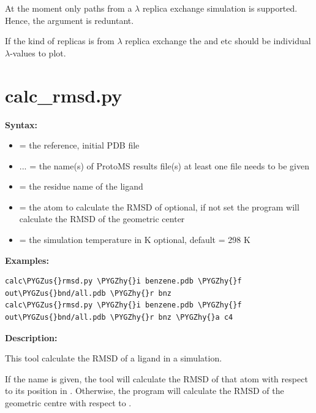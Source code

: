 \documentclass[letterpaper,10pt,english]{sphinxmanual}
\def\PYGZus{\char`\_}
\def\PYGZhy{\char`\-}
\begin{document}
At the moment only paths from a \(\lambda\) replica exchange simulation is supported. Hence, the  argument is reduntant.

If the kind of replicas is from \(\lambda\) replica exchange the  and  etc should be individual \(\lambda\)-values to plot.


\section{calc\_rmsd.py}
\label{tools:calc-rmsd-py}
\textbf{Syntax:}

\begin{itemize}
\item {} 
 = the reference, initial PDB file

\item {} 
 ... = the name(s) of ProtoMS results file(s)
at least one file needs to be given

\item {} 
 = the residue name of the ligand

\item {} 
 = the atom to calculate the RMSD of
optional, if not set the program will calculate the RMSD of the geometric center

\item {} 
 = the simulation temperature in K
optional, default = 298 K

\end{itemize}

\textbf{Examples:}

\begin{Verbatim}[frame=single,commandchars=\\\{\}]
calc\PYGZus{}rmsd.py \PYGZhy{}i benzene.pdb \PYGZhy{}f out\PYGZus{}bnd/all.pdb \PYGZhy{}r bnz
calc\PYGZus{}rmsd.py \PYGZhy{}i benzene.pdb \PYGZhy{}f out\PYGZus{}bnd/all.pdb \PYGZhy{}r bnz \PYGZhy{}a c4
\end{Verbatim}

\textbf{Description:}

This tool calculate the RMSD of a ligand in a simulation.

If the  name is given, the tool will calculate the RMSD of that atom with respect to its position in . Otherwise, the program will calculate the RMSD of the geometric centre with respect to .
\end{document}
